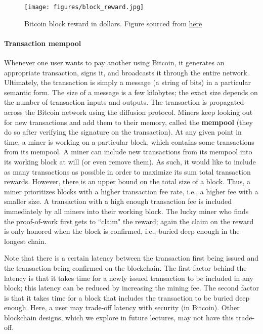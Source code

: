 \documentclass{article}
\begin{document}
\begin{figure}[p]
    \centering
    \texttt{[image: figures/block\_reward.jpg]}
    \caption{Bitcoin block reward in dollars. Figure sourced from \href{https://www.cmcmarkets.com/en/learn-cryptocurrencies/bitcoin-halving}{here}}
    \label{fig:block_rewards}
\end{figure}


\paragraph*{Transaction mempool}
Whenever one user wants to pay another using Bitcoin, it generates an appropriate transaction, signs it, and broadcasts it through the entire network. Ultimately, the transaction is simply a message (a string of bits) in a particular semantic form. The size of a message is  a few kilobytes; the exact size depends on the number of transaction inputs and outputs. The transaction is propagated across the Bitcoin network using the diffusion protocol. Miners keep looking out for new transactions and add them to their memory, called the \textbf{mempool} (they do so after verifying the signature on the transaction). At any given point in time, a miner is working on a particular block, which contains some transactions from its mempool. A miner can include new transactions from its mempool into its working block at will (or even remove them). As such, it would like to include as many transactions as possible in order to maximize its sum total transaction rewards. However, there is an upper bound on the total size of a block. Thus, a miner prioritizes blocks with a higher transaction fee rate, i.e., a higher fee with a smaller size. A transaction with a high enough transaction fee is included immediately by all miners into their working block. The lucky miner who finds the proof-of-work first gets to ``claim" the reward; again the claim on the reward is only honored when the block is confirmed, i.e., buried deep enough in the longest chain. 

Note that there is a certain latency between the transaction first being issued and the transaction being confirmed on the blockchain. The first factor behind the latency is that it takes time for a newly issued transaction to be included in any block; this latency can be reduced by increasing the mining fee. The second factor is that it takes time for a block that includes the transaction to be buried deep enough. Here, a user may trade-off latency with security (in Bitcoin). Other blockchain designs, which we explore in future lectures, may not have this trade-off.
\end{document}
